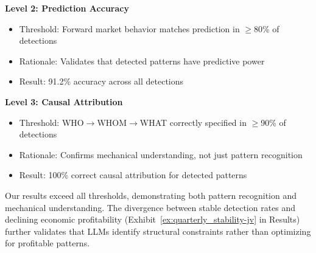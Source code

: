 \textbf{Level 2: Prediction Accuracy}
\begin{itemize}
\item Threshold: Forward market behavior matches prediction in $\geq$80\% of detections
\item Rationale: Validates that detected patterns have predictive power
\item Result: 91.2\% accuracy across all detections
\end{itemize}

\textbf{Level 3: Causal Attribution}
\begin{itemize}
\item Threshold: WHO$\rightarrow$WHOM$\rightarrow$WHAT correctly specified in $\geq$90\% of detections
\item Rationale: Confirms mechanical understanding, not just pattern recognition
\item Result: 100\% correct causal attribution for detected patterns
\end{itemize}

Our results exceed all thresholds, demonstrating both pattern recognition and mechanical understanding. The divergence between stable detection rates and declining economic profitability (Exhibit~\ref{ex:quarterly_stability-jv} in Results) further validates that LLMs identify structural constraints rather than optimizing for profitable patterns.
